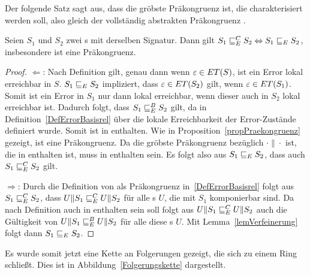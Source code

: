 Der folgende Satz sagt aus, dass \ERel{} die gröbste Präkongruenz ist, die
charakterisiert werden soll, also gleich der vollständig abstrakten
Präkongruenz \ECRel{}.

\begin{satz}
  \label{satzFullAbstractness}
  Seien $S_1$ und $S_2$ zwei \EIO{}s mit derselben Signatur. Dann gilt
  $S_1\sqsubseteq _E^C S_2\Leftrightarrow S_1\sqsubseteq _E S_2$, insbesondere ist \ERel{}
  eine Präkongruenz.
\end{satz}

\begin{proof}
  \glqq $\Leftarrow$\grqq : Nach Definition gilt, genau dann wenn
      $\varepsilon\in ET{}(S)$, ist ein Error lokal erreichbar in $S$.
      $S_1\sqsubseteq _E S_2$ impliziert, dass $\varepsilon\in
      ET{}(S_2)$ gilt, wenn $\varepsilon\in ET{}(S_1)$. Somit ist ein Error
      in $S_1$ nur dann lokal erreichbar, wenn dieser auch in $S_2$ lokal
      erreichbar ist. Dadurch folgt, dass $S_1\sqsubseteq _E^B S_2$ gilt, da \EBRel{} in
      Definition~\ref{DefErrorBasisrel} über die lokale Erreichbarkeit der
      Error-Zustände definiert wurde. Somit ist \ERel{} in \EBRel{} enthalten.
      Wie in Proposition~\ref{propPraekongruenz} gezeigt, ist \ERel{} eine
      Präkongruenz. Da \ECRel{} die gröbste Präkongruenz bezüglich
      $\cdot\|\cdot$ ist, die in \EBRel{} enthalten ist, muss \ERel{} in
      \ECRel{} enthalten sein. Es folgt also aus $S_1\sqsubseteq _E S_2$, dass auch
      $S_1\sqsubseteq _E^C{} S_2$ gilt.

      \glqq $\Rightarrow$\grqq : Durch die Definition von \ECRel{} als
      Präkongruenz in~\ref{DefErrorBasisrel} folgt aus $S_1\sqsubseteq _E^C S_2$, dass
      $U\|S_1\sqsubseteq _E^C U\|S_2$ für alle \EIO{}s $U$, die mit $S_1$ komponierbar
      sind. Da \ECRel{} nach Definition auch in \EBRel{} enthalten sein soll
      folgt aus $U\|S_1\sqsubseteq _E^C U\|S_2$ auch die Gültigkeit von $U\|S_1\sqsubseteq _E^B
      U\|S_2$ für alle diese \EIO{}s $U$. Mit Lemma~\ref{lemVerfeinerung} folgt
      dann $S_1\sqsubseteq _E S_2$.
\end{proof}

Es wurde somit jetzt eine Kette an Folgerungen gezeigt, die sich zu einem
Ring schließt. Dies ist in Abbildung~\ref{Folgerungskette} dargestellt.

